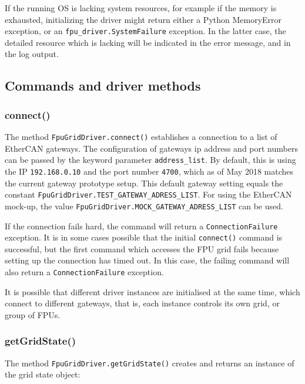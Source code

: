 \documentclass[11pt,a4paper]{report}
\begin{document}
If the running OS is lacking system resources, for example if the
memory is exhausted, initializing the driver might return either a
Python MemoryError exception, or an
\texttt{fpu\_driver.SystemFailure} exception. In the latter case,
the detailed resource which is lacking will be indicated in the error
message, and in the log output.





\subsection{Commands and driver methods}
\label{sec:commands}


\subsubsection{connect()}
\label{sec:connect}
     The method
\texttt{FpuGridDriver.connect()} establishes a connection to a list of
EtherCAN gateways. The configuration of gateways ip address and port
numbers can be passed by the keyword parameter
\texttt{address\_list}. By default, this is using the IP
\texttt{192.168.0.10} and the port number \texttt{4700}, which as of
May 2018 matches the current gateway prototype setup. This default
gateway setting equals the constant
\texttt{FpuGridDriver.TEST\_GATEWAY\_ADRESS\_LIST}.  For using the
EtherCAN mock-up, the value
\texttt{FpuGridDriver.MOCK\_GATEWAY\_ADRESS\_LIST} can be used.

If the connection fails hard, the command will return a
\texttt{ConnectionFailure} exception.  It is in some cases possible
that the initial \texttt{connect()} command is successful, but the
first command which accesses the FPU grid fails because setting up the
connection has timed out. In this case, the failing command will
also return a \texttt{ConnectionFailure} exception.

It is possible that different driver instances are initialised at the
same time, which connect to different gateways, that is, each instance
controls its own grid, or group of FPUs.


\subsubsection{getGridState()}
The method \texttt{FpuGridDriver.getGridState()} creates and returns
an instance of the grid state object:
\end{document}
